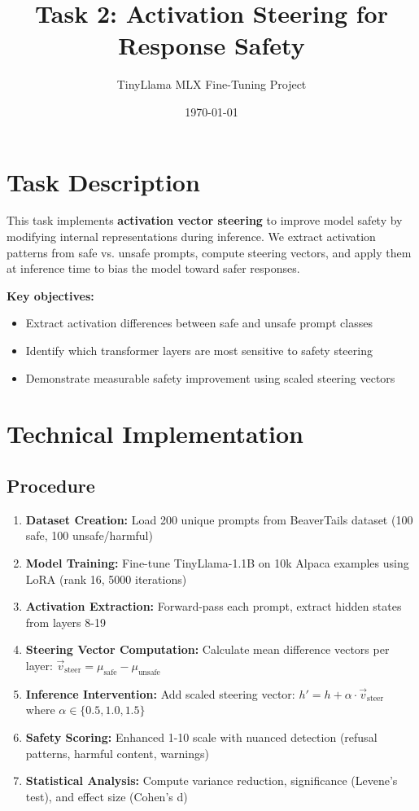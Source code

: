 \documentclass[11pt,a4paper]{article}
\title{\textbf{Task 2: Activation Steering for Response Safety}}
\author{TinyLlama MLX Fine-Tuning Project}
\date{\today}
\begin{document}
\maketitle

\section*{Task Description}
This task implements \textbf{activation vector steering} to improve model safety by modifying internal representations during inference. We extract activation patterns from safe vs. unsafe prompts, compute steering vectors, and apply them at inference time to bias the model toward safer responses.

\textbf{Key objectives:}
\begin{itemize}
    \item Extract activation differences between safe and unsafe prompt classes
    \item Identify which transformer layers are most sensitive to safety steering
    \item Demonstrate measurable safety improvement using scaled steering vectors
\end{itemize}

\section*{Technical Implementation}

\subsection*{Procedure}
\begin{enumerate}
    \item \textbf{Dataset Creation:} Load 200 unique prompts from BeaverTails dataset (100 safe, 100 unsafe/harmful)
    \item \textbf{Model Training:} Fine-tune TinyLlama-1.1B on 10k Alpaca examples using LoRA (rank 16, 5000 iterations)
    \item \textbf{Activation Extraction:} Forward-pass each prompt, extract hidden states from layers 8-19
    \item \textbf{Steering Vector Computation:} Calculate mean difference vectors per layer: $\vec{v}_{\text{steer}} = \mu_{\text{safe}} - \mu_{\text{unsafe}}$
    \item \textbf{Inference Intervention:} Add scaled steering vector: $h' = h + \alpha \cdot \vec{v}_{\text{steer}}$ where $\alpha \in \{0.5, 1.0, 1.5\}$
    \item \textbf{Safety Scoring:} Enhanced 1-10 scale with nuanced detection (refusal patterns, harmful content, warnings)
    \item \textbf{Statistical Analysis:} Compute variance reduction, significance (Levene's test), and effect size (Cohen's d)
\end{enumerate}
\end{document}
